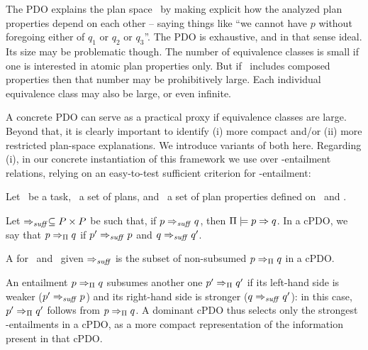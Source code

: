 The PDO explains the plan space \plans\ by making explicit how the
analyzed plan properties depend on each other -- saying things like
``we cannot have $p$ without foregoing either of $q_1$ or $q_2$ or
$q_3$''. The PDO is exhaustive, and in that sense ideal. Its size may
be problematic though. The number of equivalence classes is small if
one is interested in atomic plan properties only. But if
\props\ includes composed properties then that number may be
prohibitively large. Each individual equivalence class may also be
large, or even infinite.

A concrete PDO can serve as a practical proxy if equivalence classes
are large. Beyond that, it is clearly important to identify (i) more
compact and/or (ii) more restricted plan-space explanations. We
introduce variants of both here. Regarding (i), in our concrete
instantiation of this framework we use  over
\plans-entailment relations, relying on an easy-to-test sufficient
criterion for \plans-entailment:

\begin{definition}\label{def:dcpdo}
Let \task\ be a task, \plans\ a set of plans, and \props\ a set of
plan properties defined on \task\ and \plans.

Let $\Rightarrow_{\mathit{suff}} \subseteq P \times P$ be such that, if $p
\Rightarrow_{\mathit{suff}} q$, then $\Pi \models p \Rightarrow q$.
%
In a cPDO, we say that $p \Rightarrow_{\Pi} q$  if $p'
\Rightarrow_{\mathit{suff}} p$ and $q \Rightarrow_{\mathit{suff}} q'$.

A  for \plans\ and \props\ given
$\Rightarrow_{\mathit{suff}}$ is the subset of non-subsumed $p \Rightarrow_{\Pi} q$
in a cPDO.
%
\end{definition}

An entailment $p \Rightarrow_{\Pi} q$ subsumes another one $p'
\Rightarrow_{\Pi} q'$ if its left-hand side is weaker ($p'
\Rightarrow_{\mathit{suff}} p$) and its right-hand side is stronger ($q
\Rightarrow_{\mathit{suff}} q'$): in this case, $p' \Rightarrow_{\Pi} q'$
follows from $p \Rightarrow_{\Pi} q$. A dominant cPDO thus selects
only the strongest \plans-entailments in a cPDO, as a more compact
representation of the information present in that cPDO.%
%

